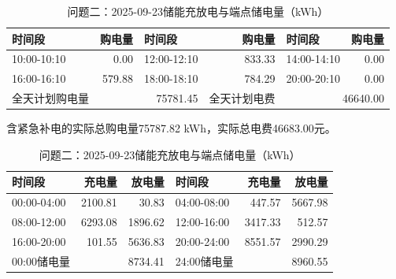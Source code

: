 \begin{table}[H]\centering\small\setlength{\tabcolsep}{5pt}
\caption{问题二：2025-09-23购电结果（电量：kWh；费用：元）}
\begin{tabular}{lrlrlr}\toprule
时间段 & 购电量 & 时间段 & 购电量 & 时间段 & 购电量 \\\midrule
10:00-10:10 & 0.00 & 12:00-12:10 & 833.33 & 14:00-14:10 & 0.00\\
16:00-16:10 & 579.88 & 18:00-18:10 & 784.29 & 20:00-20:10 & 0.00\\
\midrule 全天计划购电量 & \multicolumn{2}{r}{75781.45} & 全天计划电费 & \multicolumn{2}{r}{46640.00}\\\bottomrule
\end{tabular}
\par\vspace{2pt}\footnotesize
含紧急补电的实际总购电量75787.82 kWh，实际总电费46683.00元。
\vspace{3pt}\small
\caption{问题二：2025-09-23储能充放电与端点储电量（kWh）}
\begin{tabular}{lrrlrr}\toprule
时间段 & 充电量 & 放电量 & 时间段 & 充电量 & 放电量 \\\midrule
00:00-04:00 & 2100.81 & 30.83 & 04:00-08:00 & 447.57 & 5667.98\\
08:00-12:00 & 6293.08 & 1896.62 & 12:00-16:00 & 3417.33 & 512.57\\
16:00-20:00 & 101.55 & 5636.83 & 20:00-24:00 & 8551.57 & 2990.29\\
\midrule 00:00储电量 & \multicolumn{2}{r}{8734.41} & 24:00储电量 & \multicolumn{2}{r}{8960.55}\\\bottomrule
\end{tabular}\end{table}
